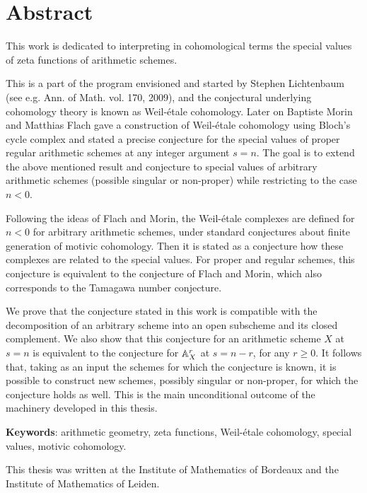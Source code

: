\chapter*{Abstract}

This work is dedicated to interpreting in cohomological terms the special values
of zeta functions of arithmetic schemes.

This is a part of the program envisioned and started by Stephen Lichtenbaum
(see e.g. Ann. of Math. vol. 170, 2009), and the conjectural underlying
cohomology theory is known as Weil-étale cohomology.  Later on Baptiste Morin
and Matthias Flach gave a construction of Weil-étale cohomology using Bloch's
cycle complex and stated a precise conjecture for the special values of proper
regular arithmetic schemes at any integer argument $s=n$. The goal is to extend
the above mentioned result and conjecture to special values of arbitrary
arithmetic schemes (possible singular or non-proper) while restricting to the
case $n<0$.

Following the ideas of Flach and Morin, the Weil-étale complexes are defined for
$n < 0$ for arbitrary arithmetic schemes, under standard conjectures about
finite generation of motivic cohomology. Then it is stated as a conjecture how
these complexes are related to the special values. For proper and regular
schemes, this conjecture is equivalent to the conjecture of Flach and Morin,
which also corresponds to the Tamagawa number conjecture.

We prove that the conjecture stated in this work is compatible with the
decomposition of an arbitrary scheme into an open subscheme and its closed
complement. We also show that this conjecture for an arithmetic scheme $X$ at
$s=n$ is equivalent to the conjecture for $\AA^r_X$ at $s=n-r$, for any
$r\geq 0$. It follows that, taking as an input the schemes for which the
conjecture is known, it is possible to construct new schemes, possibly singular
or non-proper, for which the conjecture holds as well. This is the main
unconditional outcome of the machinery developed in this thesis.

\ifdutch
\else
\vspace{1em}
\noindent\textbf{Keywords}: arithmetic geometry, zeta functions, Weil-étale
cohomology, special values, motivic cohomology.

This thesis was written at the Institute of Mathematics of Bordeaux and the
Institute of Mathematics of Leiden.
\fi
